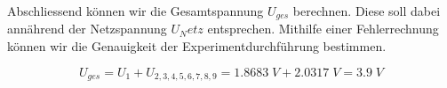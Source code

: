 \documentclass[a4paper,12pt]{article}
\begin{document}
Abschliessend können wir die Gesamtspannung $U_{ges}$ berechnen. Diese soll dabei annährend der Netzspannung $U_Netz$ entsprechen. Mithilfe einer Fehlerrechnung können wir die Genauigkeit der Experimentdurchführung bestimmen.


$$U_{ges} = U_1 + U_{2,3,4,5,6,7,8,9} = 1.8683\; V + 2.0317\; V = 3.9\; V$$


%
%
%
%
%
%
%
%
%
\end{document}
